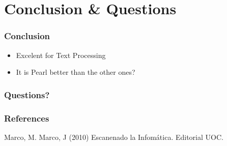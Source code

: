 \documentclass{beamer}
\begin{document}
\section{Conclusion \& Questions}
\begin{frame}
 \frametitle{Conclusion}
\begin{itemize}
\item Excelent for Text Processing
\item It is Pearl better than the other ones?
\end{itemize}
\end{frame}
\begin{frame}
 \frametitle{Questions?}
\end{frame}
\begin{frame}
 \frametitle{References}
\begin{thebibliography}{10}
Marco, M. Marco, J (2010) Escanenado la Infomática. Editorial UOC. 
\end{thebibliography}
\end{frame}
\end{document}

